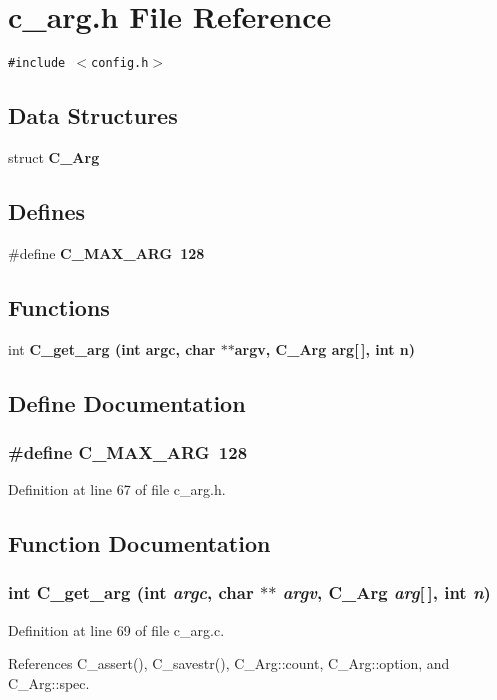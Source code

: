 \section{c\_\-arg.h File Reference}
\label{c__arg_8h}
{\tt \#include $<$config.h$>$}\par
\subsection*{Data Structures}
\begin{CompactItemize}
\item 
struct \bf{C\_\-Arg}
\end{CompactItemize}
\subsection*{Defines}
\begin{CompactItemize}
\item 
\#define \bf{C\_\-MAX\_\-ARG}~128
\end{CompactItemize}
\subsection*{Functions}
\begin{CompactItemize}
\item 
int \bf{C\_\-get\_\-arg} (int argc, char $\ast$$\ast$argv, \bf{C\_\-Arg} arg[$\,$], int n)
\end{CompactItemize}


\subsection{Define Documentation}
\subsubsection{\setlength{\rightskip}{0pt plus 5cm}\#define C\_\-MAX\_\-ARG~128}\label{c__arg_8h_0c93b0541887cf5531d9f8dbb3c6e30b}




Definition at line 67 of file c\_\-arg.h.

\subsection{Function Documentation}
\subsubsection{\setlength{\rightskip}{0pt plus 5cm}int C\_\-get\_\-arg (int {\em argc}, char $\ast$$\ast$ {\em argv}, \bf{C\_\-Arg} {\em arg}[$\,$], int {\em n})}\label{c__arg_8h_95c2f2213bd62dac92c474e43b107655}




Definition at line 69 of file c\_\-arg.c.

References C\_\-assert(), C\_\-savestr(), C\_\-Arg::count, C\_\-Arg::option, and C\_\-Arg::spec.